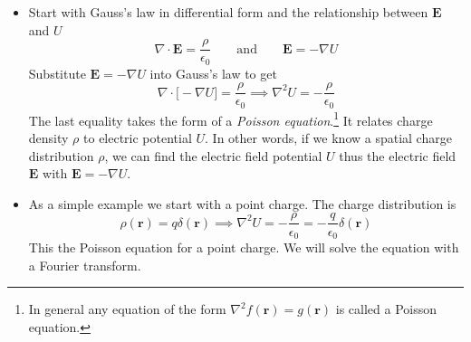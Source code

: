 \documentclass[11pt, a4paper]{article}
\newcommand{\eqtext}[1]{\qquad \text{#1} \qquad}
\renewcommand{\vec}[1]{\bm{#1}} %
\renewcommand{\r}{\vec{r}}
\newcommand{\E}{\vec{E}} %
\renewcommand{\div}{\nabla \cdot}
\renewcommand{\grad}{\nabla}
\begin{document}
\begin{itemize}
	\item Start with Gauss's law in differential form and the relationship between $ \E $ and $ U $
	\begin{equation*}
		\div \vec{E} = \frac{\rho}{\epsilon_{0}} \eqtext{and} \vec{E} = - \grad U
	\end{equation*}
	Substitute $ \E = - \grad U $ into Gauss's law to get
	\begin{equation*}
		\div \big[-\grad U\big] = \frac{\rho}{\epsilon_{0}} \implies \nabla^{2}U = -\frac{\rho}{\epsilon_{0}}
	\end{equation*}
	The last equality takes the form of a \textit{Poisson equation}.\footnote{In general any equation of the form $ \nabla^{2}f(\r) = g(\r) $ is called a Poisson equation.} It relates charge density $ \rho $ to electric potential $ U $. In other words, if we know a spatial charge distribution $ \rho $, we can find the electric field potential $ U $ thus the electric field $ \vec{E} $ with $ \E = - \grad U $.
	
	\item As a simple example we start with a point charge. The charge distribution is
	\begin{equation*}
		\rho(\vec{r}) = q \delta(\vec{r}) \implies \nabla^{2}U = -\frac{\rho}{\epsilon_{0}} = - \frac{q}{\epsilon_{0}}\delta(\r)
	\end{equation*}
	This the Poisson equation for a point charge. We will solve the equation with a Fourier transform.
	

\end{itemize}
\end{document}
